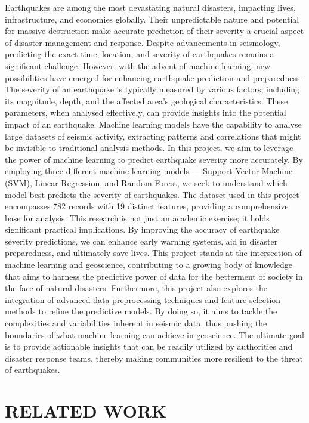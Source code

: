 \documentclass{article}
\begin{document}
Earthquakes are among the most devastating natural disasters, impacting lives, infrastructure, and economies globally. Their unpredictable nature and potential for massive destruction make accurate prediction of their severity a crucial aspect of disaster management and response. Despite advancements in seismology, predicting the exact time, location, and severity of earthquakes remains a significant challenge. However, with the advent of machine learning, new possibilities have emerged for enhancing earthquake prediction and preparedness.
The severity of an earthquake is typically measured by various factors, including its magnitude, depth, and the affected area's geological characteristics. These parameters, when analysed effectively, can provide insights into the potential impact of an earthquake. Machine learning models have the capability to analyse large datasets of seismic activity, extracting patterns and correlations that might be invisible to traditional analysis methods.
In this project, we aim to leverage the power of machine learning to predict earthquake severity more accurately. By employing three different machine learning models — Support Vector Machine (SVM), Linear Regression, and Random Forest, we seek to understand which model best predicts the severity of earthquakes. The dataset used in this project encompasses 782 records with 19 distinct features, providing a comprehensive base for analysis.
This research is not just an academic exercise; it holds significant practical implications. By improving the accuracy of earthquake severity predictions, we can enhance early warning systems, aid in disaster preparedness, and ultimately save lives. This project stands at the intersection of machine learning and geoscience, contributing to a growing body of knowledge that aims to harness the predictive power of data for the betterment of society in the face of natural disasters.
Furthermore, this project also explores the integration of advanced data preprocessing techniques and feature selection methods to refine the predictive models. By doing so, it aims to tackle the complexities and variabilities inherent in seismic data, thus pushing the boundaries of what machine learning can achieve in geoscience. The ultimate goal is to provide actionable insights that can be readily utilized by authorities and disaster response teams, thereby making communities more resilient to the threat of earthquakes.




\section{RELATED WORK}
\end{document}
